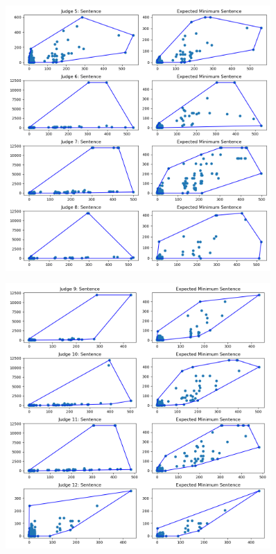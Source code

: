 \documentclass[11pt, oneside]{article}   	%
\theoremstyle{ModifiedStyle}
\begin{document}
			\begin{figure}[H]
				\centering
				\includegraphics[width=0.9\textwidth]{../../output/figures/Exploration/judge_convex_hulls_1.png}
			\end{figure}

			\begin{figure}[H]
				\centering
				\includegraphics[width=0.9\textwidth]{../../output/figures/Exploration/judge_convex_hulls_2.png}
			\end{figure}
\end{document}
